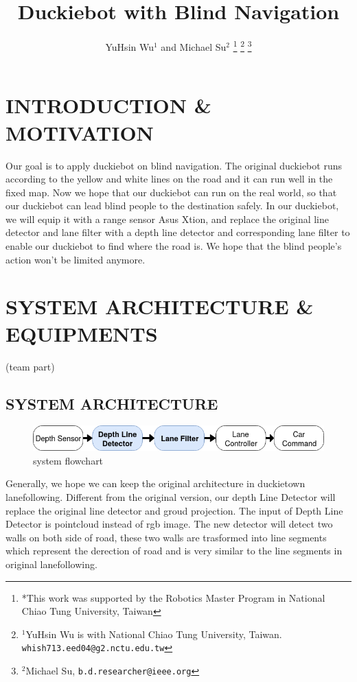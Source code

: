 \documentclass[letterpaper, 10 pt, conference]{ieeeconf}  %
\title{\LARGE \bf
Duckiebot with Blind Navigation
}
\author{YuHsin Wu$^{1}$ and Michael Su$^{2}$%
\thanks{*This work was supported by the Robotics Master Program in National Chiao Tung University, Taiwan}%
\thanks{$^{1}$YuHsin Wu is with National Chiao Tung University, Taiwan.
        {\tt\small whish713.eed04@g2.nctu.edu.tw}}%
\thanks{$^{2}$Michael Su,
        {\tt\small b.d.researcher@ieee.org}}%
}
\begin{document}
\maketitle
\thispagestyle{empty}
\pagestyle{empty}


\section{INTRODUCTION \& MOTIVATION}

Our goal is to apply duckiebot on blind navigation. The original duckiebot runs according to the yellow and white lines on the road and it can run well in the fixed map. Now we hope that our duckiebot can run on the real world, so that our duckiebot can lead blind people to the destination safely. In our duckiebot, we will equip it with a range sensor Asus Xtion, and replace the original line detector and lane filter with a depth line detector and corresponding lane filter to enable our duckiebot to find where the road is. We hope that the blind people's action won't be limited anymore.

\section{SYSTEM ARCHITECTURE \& EQUIPMENTS}

(team part)

\subsection{SYSTEM ARCHITECTURE}
\begin{figure}[h] %
\includegraphics[width=1.0\columnwidth]{system_flowchart.png}
\centering
\caption{system flowchart}
\end{figure}

Generally, we hope we can keep the original architecture in duckietown lanefollowing. Different from the original version, our depth Line Detector will replace the original line detector and groud projection. The input of Depth Line Detector is pointcloud instead of rgb image. The new detector will detect two walls on both side of road, these two walls are trasformed into line segments which represent the derection of road and is very similar to the line segments in original lanefollowing. 
\end{document}
